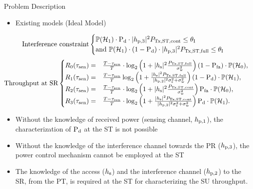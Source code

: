 \documentclass[12pt]{beamer}
\newcommand{\fs}[2]{\fontsize{#1 pt}{#2}\selectfont}
\begin{document}
\begin{frame}{Problem Description}
        \fs{8}{8}
		\begin{itemize}
		\item Existing models (Ideal Model)
		\end{itemize}
		\vspace{-0.2cm}
                     \begin{align*}
	             	\text{Interference constraint} 
			\begin{cases}
			\mathbb P(\mathcal{H}_1) \cdot \text{P}_{\text{d}} \cdot |h_{\text{p,3}}|^2 P_{\text{Tx,ST,cont}} \le \theta_{\text{I}} \\
		     	\text{and   } \mathbb P(\mathcal{H}_1) \cdot (1 - \text{P}_{\text{d}}) \cdot |h_{\text{p,3}}|^2 P_{\text{Tx,ST,full}} \le \theta_{\text{I}}			    	\end{cases} 
		     \end{align*}
		\vspace{-0.2cm}
                     \begin{align*}
		        \text{Throughput at SR}
			\begin{cases}		
			R_{\text{0}}(\tau_{\text{sen}}) =& \frac{T- \tau_{\text{sen}}}{T} \cdot \log_2 \left(1 + |h_{\text{s}}|^2 \frac{P_{\text{Tx,ST,full}}}{\sigma^2_{\text{w}}}\right) (1 - \text{P}_{\text{fa}} ) \cdot \mathbb P(\mathcal{H}_0),  \\ 
			R_{\text{1}}(\tau_{\text{sen}}) =& \frac{T- \tau_{\text{sen}}}{T} \log_2 \left(1 + \frac{|h_{\text{s}}|^2 P_{\text{Tx,ST,full}} }{|h_{\text{p,2}}|^2 \sigma^2_{\text{s}}  + \sigma^2_{\text{w}}} \right) (1 - \text{P}_{\text{d}}) \cdot \mathbb P(\mathcal{H}_1),  \\ 
			R_{\text{2}}(\tau_{\text{sen}}) =& \frac{T- \tau_{\text{sen}}}{T} \cdot \log_2 \left(1 + |h_{\text{s}}|^2 \frac{P_{\text{Tx,ST,cont}}}{\sigma^2_{\text{w}}}\right) \text{P}_{\text{fa}} \cdot \mathbb P(\mathcal{H}_0),  \\ 
			R_{\text{3}}(\tau_{\text{sen}}) =& \frac{T- \tau_{\text{sen}}}{T} \cdot \log_2 \left(1 + \frac{|h_{\text{s}}|^2 P_{\text{Tx,ST,cont}} }{|h_{\text{p,2}}|^2 \sigma^2_{\text{s}}  + \sigma^2_{\text{w}}} \right) \text{P}_{\text{d}} \cdot \mathbb P(\mathcal{H}_1).  
			\end{cases}
		     \end{align*}
                \begin{itemize}
                \item Without the knowledge of received power (sensing channel, $h_{\text{p,1}}$), the characterization of $\text{P}_{\text{d}}$ at the ST is not possible
		\item Without the knowledge of the interference channel towards the PR ($h_{\text{p,3}}$), the power control mechanism cannot be employed at the ST
		\item The knowledge of the access ($h_{\text{s}}$) and the interference channel ($h_{\text{p,2}}$) to the SR, from the PT, is required at the ST for characterizing the SU throughput.
		\end{itemize}
\end{frame}
\end{document}
